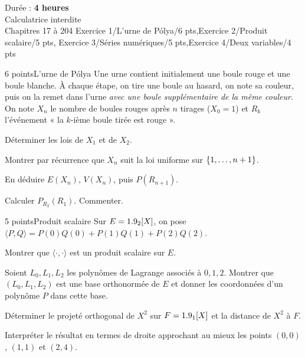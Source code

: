
  {Durée : \textbf{4 heures}\\Calculatrice interdite\\Chapitres 17 à 20}{4}
  {Exercice 1/L'urne de Pólya/6 pts,Exercice 2/Produit scalaire/5 pts,%
   Exercice 3/Séries numériques/5 pts,Exercice 4/Deux variables/4 pts}

\begin{exoEval}{6 points}{L'urne de Pólya}
Une urne contient initialement une boule rouge et une boule blanche. À
chaque étape, on tire une boule au hasard, on note sa couleur, puis on la
remet dans l'urne \emph{avec une boule supplémentaire de la même couleur}.
On note $X_n$ le nombre de boules rouges après $n$ tirages ($X_0=1$) et
$R_k$ l'événement « la $k$-ième boule tirée est rouge ».
\begin{questions}
  \item Déterminer les lois de $X_1$ et de $X_2$.
  \item Montrer par récurrence que $X_n$ suit la loi uniforme sur
    $\left\{1,\dots,n+1\right\}$.
  \item En déduire $E(X_n)$, $V(X_n)$, puis $P(R_{n+1})$.
  \item Calculer $P_{R_2}(R_1)$. Commenter.
\end{questions}
\end{exoEval}

\begin{exoEval}{5 points}{Produit scalaire}
Sur $E=1.9_2[X]$, on pose
$\langle P,Q\rangle=P(0)Q(0)+P(1)Q(1)+P(2)Q(2)$.
\begin{questions}
  \item Montrer que $\langle\cdot,\cdot\rangle$ est un produit scalaire
    sur $E$.
  \item Soient $L_0,L_1,L_2$ les polynômes de Lagrange associés à
    $0,1,2$. Montrer que $(L_0,L_1,L_2)$ est une base orthonormée de $E$
    et donner les coordonnées d'un polynôme $P$ dans cette base.
  \item Déterminer le projeté orthogonal de $X^{2}$ sur $F=1.9_1[X]$ et la
    distance de $X^{2}$ à $F$.
  \item Interpréter le résultat en termes de droite approchant au mieux
    les points $(0,0)$, $(1,1)$ et $(2,4)$.
\end{questions}
\end{exoEval}

